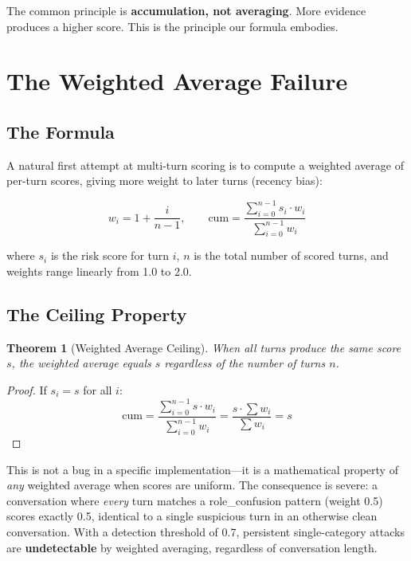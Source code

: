 \documentclass[11pt,a4paper]{article}
\newtheorem{theorem}{Theorem}
\begin{document}
The common principle is \textbf{accumulation, not averaging}. More
evidence produces a higher score. This is the principle our formula
embodies.

\section{The Weighted Average Failure}
\label{sec:failure}

\subsection{The Formula}

A natural first attempt at multi-turn scoring is to compute a weighted
average of per-turn scores, giving more weight to later turns (recency
bias):

\begin{equation}
  w_i = 1 + \frac{i}{n-1}, \qquad
  \text{cum} = \frac{\sum_{i=0}^{n-1} s_i \cdot w_i}{\sum_{i=0}^{n-1} w_i}
  \label{eq:weighted-avg}
\end{equation}

\noindent where $s_i$ is the risk score for turn $i$, $n$ is the total
number of scored turns, and weights range linearly from 1.0 to 2.0.

\subsection{The Ceiling Property}

\begin{theorem}[Weighted Average Ceiling]
\label{thm:ceiling}
When all turns produce the same score $s$, the weighted average equals
$s$ regardless of the number of turns $n$.
\end{theorem}

\begin{proof}
If $s_i = s$ for all $i$:
\[
  \text{cum} = \frac{\sum_{i=0}^{n-1} s \cdot w_i}{\sum_{i=0}^{n-1} w_i}
             = \frac{s \cdot \sum w_i}{\sum w_i}
             = s
\]
\end{proof}

This is not a bug in a specific implementation---it is a mathematical
property of \emph{any} weighted average when scores are uniform. The
consequence is severe: a conversation where \emph{every} turn matches a
role\_confusion pattern (weight 0.5) scores exactly 0.5, identical to a
single suspicious turn in an otherwise clean conversation. With a
detection threshold of 0.7, persistent single-category attacks are
\textbf{undetectable} by weighted averaging, regardless of conversation
length.
\end{document}

